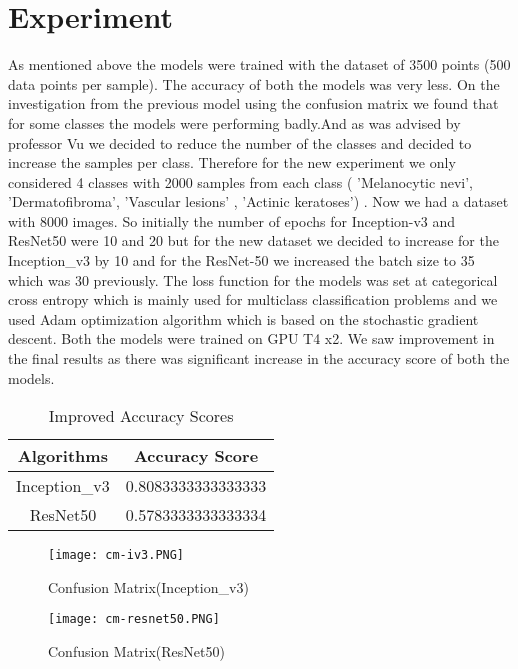 \documentclass[conference]{IEEEtran}
\begin{document}
\section{Experiment}
As mentioned above the models were trained with the dataset of 3500 points (500 data points per sample). The accuracy of both the models was very less. On the investigation from the previous model using the confusion matrix we found that for some classes the models were performing badly.And as was advised by professor Vu we decided to reduce the number of the classes and decided to increase the samples per class. Therefore for the new experiment we only considered 4 classes with 2000 samples from each class ( 'Melanocytic nevi', 'Dermatofibroma', 'Vascular lesions' , 'Actinic keratoses') . Now we had a dataset with 8000 images. So initially the number of epochs for Inception-v3 and ResNet50 were 10 and 20 but for the new dataset we decided to increase for the Inception\_v3 by 10 and for the ResNet-50 we increased the batch size to 35 which was 30 previously. The loss function for the models was set at categorical cross entropy which is mainly used for multiclass classification problems and we used Adam optimization algorithm which is based on the stochastic gradient descent. Both the models were trained on GPU T4 x2. We saw improvement in the final results as there was significant increase in the accuracy score of both the models.


\begin{table}[h]
  \centering
  \begin{tabular}{|c|c|}
    \hline
    Algorithms & Accuracy Score \\
    \hline
    Inception\_v3 & 0.8083333333333333 \\
    \hline
    ResNet50 & 0.5783333333333334 \\
    \hline
  \end{tabular}
  \caption{Improved Accuracy Scores }
  \label{tab:mytable}
\end{table}

\begin{figure}[h]
    \centering
    \texttt{[image: cm-iv3.PNG]}
    \caption{Confusion Matrix(Inception\_v3)}
    \label{fig}
\end{figure}

\begin{figure}[h]
    \centering
    \texttt{[image: cm-resnet50.PNG]}
    \caption{Confusion Matrix(ResNet50)}
    \label{fig : img2}
\end{figure}
\end{document}
